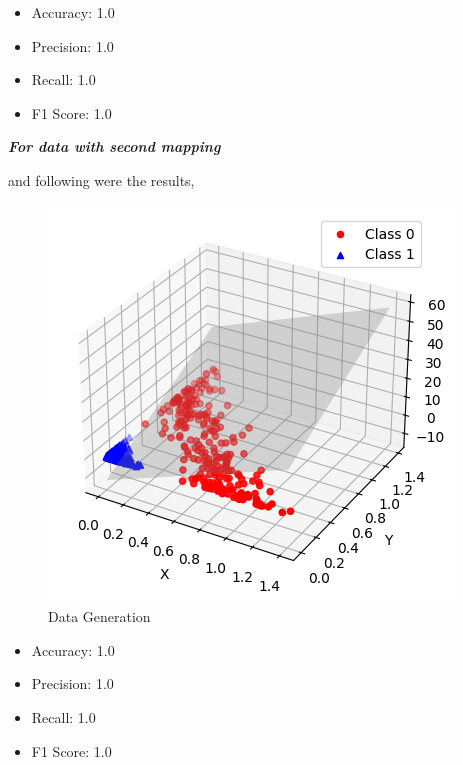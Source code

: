 \documentclass[11pt,a4paper]{article}
\begin{document}
\begin{itemize}
    \item Accuracy: 1.0
    \item Precision: 1.0 
    \item Recall: 1.0 
    \item F1 Score: 1.0
\end{itemize}



\textbf{\textit{For data with second mapping}}\\

\lstset{style=mystyle}


and following were the results,

{\begin{figure}[h]
    \centering
    \includegraphics[width=1.0\linewidth]{images/5.png}
    \caption{Data Generation}
\end{figure}}


\begin{itemize}
    \item Accuracy: 1.0 
    \item Precision: 1.0 
    \item Recall: 1.0 
    \item F1 Score: 1.0
\end{itemize}
\end{document}
